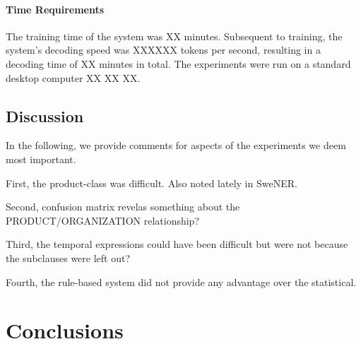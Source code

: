 \documentclass[11pt]{article}
\begin{document}
\paragraph{Time Requirements}

The training time of the system was XX minutes. Subsequent to training, the system's decoding speed was XXXXXX tokens per second, resulting in a decoding time of XX minutes in total. The experiments were run on a standard desktop computer XX XX XX.


\subsection{Discussion}
\label{sec: discussion}

In the following, we provide comments for aspects of the experiments we deem most important. 

First, the product-class was difficult. Also noted lately in SweNER.

Second, confusion matrix revelas something about the PRODUCT/ORGANIZATION relationship?

Third, the temporal expressions could have been difficult but were not because the subclauses were left out?

Fourth, the rule-based system did not provide any advantage over the statistical.



\section{Conclusions}
\label{sec: conclusions}





\newpage

%

\end{document}
